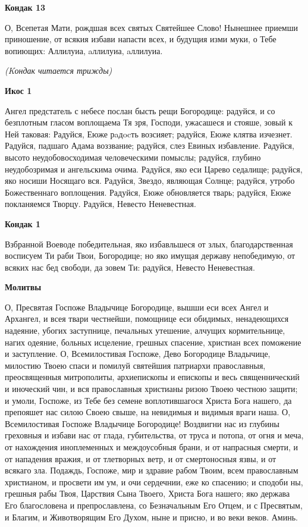\bfseries Кондак 13\normalfont{}


О, Всепетая Мати, рождшая всех святых Святейшее Слово! Нынешнее приемши приношение, от всякия избави напасти всех, и будущия изми муки, о Тебе вопиющих: Аллилуиа, aллилуиа, aллилуиа.


\itshape (Kондак читается трижды)\normalfont{}


\bfseries Икос 1\normalfont{}


Ангел предстатель с небесе послан бысть рещи Богородице: радуйся, и со безплотным гласом воплощаема Тя зря, Господи, ужасашеся и стояше, зовый к Ней таковая: Радуйся, Еюже рaдocть возсияет; радуйся, Еюже клятва изчезнет. Радуйся, падшаго Адама воззвание; радуйся, слез Евиных избавление. Радуйся, высото неудобовосходимая человеческими помыслы; радуйся, глубино неудобозримая и ангельскима очима. Радуйся, яко еси Царево седалище; радуйся, яко носиши Носящаго вся. Радуйся, Звездо, являющая Солнце; радуйся, утробо Божественнаго воплощения. Радуйся, Еюже обновляется тварь; радуйся, Еюже покланяемся Творцу. Радуйся, Невесто Неневестная.


\bfseries Кондак 1\normalfont{}


Взбранной Воеводе победительная, яко избавльшеся от злых, благодарственная восписуем Ти раби Твои, Богородице; но яко имущая державу непобедимую, от всяких нас бед свободи, да зовем Ти: радуйся, Невесто Неневестная.


\bfseries Молитвы\normalfont{}


О, Пресвятая Госпоже Владычице Богородице, вышши еси всех Ангел и Архангел, и всея твари честнейши, помощнице еси обидимых, ненадеющихся надеяние, убогих заступнице, печальных утешение, алчущих кормительнице, нагих одеяние, больных исцеление, грешных спасение, христиан всех поможение и заступление. О, Всемилостивая Госпоже, Дево Богородице Владычице, милостию Твоею спаси и помилуй святейшия патриархи православныя, преосвященныя митрополиты, архиепископы и епископы и весь священнический и иноческий чин, и вся православныя христианы ризою Твоею честною защити; и умоли, Госпоже, из Тебе без семене воплотившагося Христа Бога нашего, да препояшет нас силою Своею свыше, на невидимыя и видимыя враги наша. О, Всемилостивая Госпоже Владычице Богородице! Воздвигни нас из глубины греховныя и избави нас от глада, губительства, от труса и потопа, от огня и меча, от нахождения иноплеменных и междоусобныя брани, и от напрасныя смерти, и от нападения вражия, и от тлетворных ветр, и от смертоносныя язвы, и от всякаго зла. Подаждь, Госпоже, мир и здравие рабом Твоим, всем православным христианом, и просвети им ум, и очи сердечнии, еже ко спасению; и сподоби ны, грешныя рабы Твоя, Царствия Сына Твоего, Христа Бога нашего; яко держава Его благословена и препрославлена, со Безначальным Его Отцем, и с Пресвятым, и Благим, и Животворящим Его Духом, ныне и присно, и во веки веков. Аминь.


